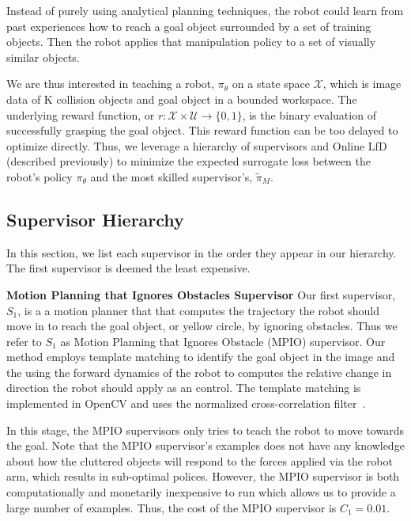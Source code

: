\documentclass[10pt, conference]{ieeeconf}      %
\begin{document}
Instead of purely using analytical planning techniques, the robot could learn from past experiences how to reach a goal object surrounded by a set of training objects. Then the robot applies that manipulation policy to a set of  visually similar objects. 

We are thus interested in teaching a robot, $\pi_\theta$ on a state space $\mathcal{X}$, which is image data of  K collision objects and goal object in a bounded workspace.  The underlying reward function, or $r: \mathcal{X}\times \mathcal{U} \rightarrow \lbrace 0, 1\rbrace$, is the binary evaluation of successfully grasping the goal object. This reward function can be too delayed to optimize directly. Thus, we leverage a hierarchy of supervisors and Online LfD (described previously) to minimize the expected surrogate loss between the robot's policy $\pi_\theta$ and the most skilled supervisor's, $\tilde{\pi}_M$. 




\subsection{Supervisor Hierarchy}\label{sec:hier}
In this section, we list each supervisor in the order they appear in our hierarchy. The first supervisor is deemed the least expensive. 

\noindent \textbf{Motion Planning that Ignores Obstacles Supervisor} Our first supervisor, $S_1$, is a a motion planner that that computes the trajectory the robot should move in to reach the goal object, or yellow circle, by ignoring obstacles.  Thus we refer to $S_1$ as Motion Planning that Ignores Obstacle (MPIO) supervisor. Our method employs template matching to identify the goal object in the image and the using the forward dynamics of the robot to computes the relative change in direction the robot should apply as an control. The template matching is implemented in OpenCV and uses the normalized cross-correlation filter~\cite{opencv_library}.

In this stage, the MPIO supervisors only tries to teach the robot to move towards the goal. Note that the MPIO supervisor's examples does not have any knowledge about how the cluttered objects will respond to the forces applied via the robot arm, which results in sub-optimal polices. However, the MPIO supervisor is both computationally and monetarily inexpensive to run which allows us to provide a large number of examples. Thus, the cost of the MPIO supervisor is $C_1 = 0.01$. 
\end{document}
